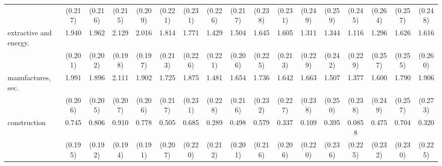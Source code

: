 {\begin{tabular}{l*{16}{c}}
                    &     (0.217)         &     (0.216)         &     (0.215)         &     (0.209)         &     (0.221)         &     (0.231)         &     (0.226)         &     (0.217)         &     (0.238)         &     (0.231)         &     (0.249)         &     (0.259)         &     (0.245)         &     (0.264)         &     (0.257)         &     (0.248)         \\
[1em]
extractive and energy.&       1.940\sym{***}&       1.962\sym{***}&       2.129\sym{***}&       2.016\sym{***}&       1.814\sym{***}&       1.771\sym{***}&       1.429\sym{***}&       1.504\sym{***}&       1.645\sym{***}&       1.605\sym{***}&       1.311\sym{***}&       1.344\sym{***}&       1.116\sym{***}&       1.296\sym{***}&       1.626\sym{***}&       1.616\sym{***}\\
                    &     (0.201)         &     (0.202)         &     (0.198)         &     (0.197)         &     (0.213)         &     (0.226)         &     (0.221)         &     (0.206)         &     (0.225)         &     (0.213)         &     (0.229)         &     (0.242)         &     (0.229)         &     (0.257)         &     (0.255)         &     (0.260)         \\
[1em]
manufactures, sec.  &       1.991\sym{***}&       1.896\sym{***}&       2.111\sym{***}&       1.902\sym{***}&       1.725\sym{***}&       1.875\sym{***}&       1.481\sym{***}&       1.654\sym{***}&       1.736\sym{***}&       1.642\sym{***}&       1.663\sym{***}&       1.507\sym{***}&       1.377\sym{***}&       1.600\sym{***}&       1.790\sym{***}&       1.906\sym{***}\\
                    &     (0.206)         &     (0.205)         &     (0.207)         &     (0.206)         &     (0.217)         &     (0.231)         &     (0.228)         &     (0.216)         &     (0.232)         &     (0.227)         &     (0.238)         &     (0.250)         &     (0.238)         &     (0.249)         &     (0.257)         &     (0.273)         \\
[1em]
construction        &       0.745\sym{***}&       0.806\sym{***}&       0.910\sym{***}&       0.778\sym{***}&       0.505\sym{*}  &       0.685\sym{**} &       0.289         &       0.498\sym{*}  &       0.579\sym{**} &       0.337         &       0.109         &       0.395         &      0.0858         &       0.475\sym{*}  &       0.704\sym{**} &       0.320         \\
                    &     (0.195)         &     (0.192)         &     (0.194)         &     (0.191)         &     (0.207)         &     (0.220)         &     (0.212)         &     (0.201)         &     (0.216)         &     (0.206)         &     (0.220)         &     (0.236)         &     (0.225)         &     (0.232)         &     (0.230)         &     (0.225)         \\

\end{tabular}}
